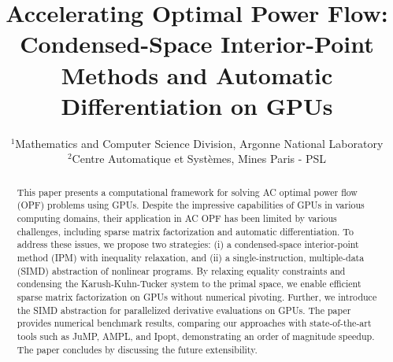 % 
\title{Accelerating Optimal Power Flow: Condensed-Space Interior-Point Methods and Automatic Differentiation on GPUs}

\author{
\and
{}
}

\date{\small
  $^{1}$Mathematics and Computer Science Division, Argonne National Laboratory\\
  $^{2}$Centre Automatique et Syst\`{e}mes, Mines Paris - PSL
}

\maketitle
\begin{abstract}
This paper presents a computational framework for solving AC optimal
power flow (OPF) problems using GPUs.  Despite the impressive
capabilities of GPUs in various computing domains, their application
in AC OPF has been limited by various challenges, including sparse
matrix factorization and automatic differentiation.  To address these
issues, we propose two strategies: (i) a condensed-space
interior-point method (IPM) with inequality relaxation, and (ii) a
single-instruction, multiple-data (SIMD) abstraction of nonlinear
programs.  By relaxing equality constraints and condensing the
Karush-Kuhn-Tucker system to the primal space, we enable efficient
sparse matrix factorization on GPUs without numerical pivoting.
Further, we introduce the SIMD abstraction for parallelized derivative
evaluations on GPUs.  The paper provides numerical benchmark results,
comparing our approaches with state-of-the-art tools such as JuMP,
AMPL, and Ipopt, demonstrating an order of magnitude 
speedup.  The paper concludes by discussing the future extensibility.
\end{abstract}


